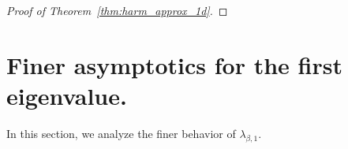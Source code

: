 \documentclass[10pt]{article}
\newcommand{\1}{\mathbbm 1}
\renewcommand{\o}{\mathrm{o}}
\newtheorem{lemma}{Lemma}
\begin{document}
\begin{proof}[Proof of Theorem~\ref{thm:harm_approx_1d}]


    \end{proof}


    \section{Finer asymptotics for the first eigenvalue.}
        In this section, we analyze the finer behavior of $\lambda_{\beta,1}$. 
\end{document}
